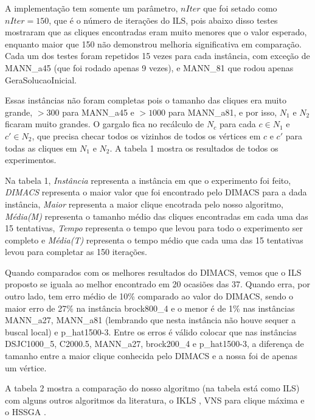 \documentclass{article}
\begin{document}
A implementação tem somente um parâmetro, $nIter$ que foi setado como $nIter = 150$, que é o número de iterações do ILS, pois abaixo disso testes mostraram que as cliques encontradas eram muito menores que o valor esperado, enquanto maior que 150 não demonstrou melhoria significativa em comparação. Cada um dos testes foram repetidos 15 vezes para cada instância, com exceção de MANN\_a45 (que foi rodado apenas 9 vezes), e MANN\_81 que rodou apenas GeraSolucaoInicial. \par

Essas instâncias não foram completas pois o tamanho das cliques era muito grande, $> 300$ para MANN\_a45  e $>1000$ para MANN\_a81, e por isso, $N_1$ e $N_2$ ficaram muito grandes. O gargalo fica no recálculo de $N_c$ para cada $c \in N_1$ e $c' \in N_2$, que precisa checar todos os vizinhos de todos os vértices em $c$ e $c'$ para todas as cliques em $N_1$ e $N_2$. A tabela 1 mostra os resultados de todos os experimentos.\par

Na tabela 1, \textit{Instância} representa a instância em que o experimento foi feito, \textit{DIMACS} representa o maior valor que foi encontrado pelo DIMACS \cite{DIMACS2} para a dada instância, \textit{Maior} representa a maior clique encotrada pelo nosso algoritmo, \textit{Média(M)} representa o tamanho médio das cliques encontradas em cada uma das 15 tentativas, \textit{Tempo} representa o tempo que levou para todo o experimento ser completo e \textit{Média(T)} representa o tempo médio que cada uma das 15 tentativas levou para completar as 150 iterações.\par

Quando comparados com os melhores resultados do DIMACS, vemos que o ILS proposto se iguala ao melhor encontrado em 20 ocasiões das 37. Quando erra, por outro lado, tem erro médio de 10\% comparado ao valor do DIMACS, sendo o maior erro de 27\% na instância brock800\_4 e o menor é de 1\% nas instâncias MANN\_a27, MANN\_a81 (lembrando que nesta instância não houve sequer a buscal local) e p\_hat1500-3. Entre os erros é válido colocar que nas instâncias DSJC1000\_5, C2000.5, MANN\_a27, brock200\_4 e p\_hat1500-3, a diferença de tamanho entre a maior clique conhecida pelo DIMACS e a nossa foi de apenas um vértice.\par

A tabela 2 mostra a comparação do nosso algoritmo (na tabela está como ILS) com alguns outros algoritmos da literatura, o IKLS \cite{kopt}, VNS para clique máxima \cite{vns} e o HSSGA \cite{HSSGA}.\par
\end{document}
